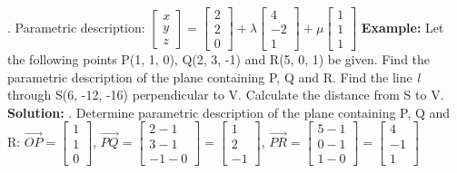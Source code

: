 . Parametric description:
\newline
$\begin{bmatrix} x \\ y \\ z\end{bmatrix} = \begin{bmatrix} 2 \\ 2 \\ 0\end{bmatrix} + \lambda \begin{bmatrix} 4 \\ -2 \\ 1 \end{bmatrix} + \mu \begin{bmatrix} 1 \\ 1 \\ 1\end{bmatrix}$
\newpage
\textbf{Example:}
\newline
Let the following points P(1, 1, 0), Q(2, 3, -1) and R(5, 0, 1) be given. Find the parametric description of the plane containing P, Q and R. Find the line \textit{l} through S(6, -12, -16) perpendicular to V. Calculate the distance from S to V.
\newline
\textbf{Solution:}
. Determine parametric description of the plane containing P, Q and R:
\newline
$\vec{OP} = \begin{bmatrix} 1 \\ 1 \\ 0 \end{bmatrix}$, 
$\vec{PQ} = \begin{bmatrix} 2 - 1 \\ 3 - 1 \\ -1 - 0 \end{bmatrix} = \begin{bmatrix} 1 \\ 2 \\ -1 \end{bmatrix}$,
$\vec{PR} = \begin{bmatrix} 5 - 1 \\ 0 - 1 \\ 1 - 0 \end{bmatrix} = \begin{bmatrix} 4 \\ -1 \\ 1 \end{bmatrix}$
\newline
